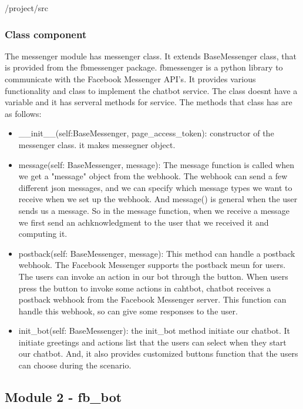 /project/src


\subsubsection {Class component}

The messenger module has messenger class. It extends BaseMessenger class, that is provided from the fbmessenger package. fbmessenger is a python library to communicate with the Facebook Messenger API's. It provides various functionality and class to implement the chatbot service. The class doesnt have a variable and it has serveral methods for service. The methods that class has are as follows:

\begin{itemize}
\item \_\_init\_\_(self:BaseMessenger, page\_access\_token): constructor of the messenger class. it makes messegner object.
\item message(self: BaseMessenger, message): The message function is called when we get a "message" object from the webhook. The webhook can send a few different json messages, and we can specify which message types we want to receive when we set up the webhook. And message() is general when the user sends us a message. So in the message function, when we receive a message we first send an achknowledgment to the user that we received it and computing it. 
\item postback(self: BaseMessenger, message): This method can handle a postback webhook. The Facebook Messenger supports the postback meun for users. The users can invoke an action in our bot through the button. When users press the button to invoke some actions in cahtbot, chatbot receives a postback webhook from the Facebook Messenger server. This function can handle this webhook, so can give some responses to the user.
\item init\_bot(self: BaseMessenger): the init\_bot method initiate our chatbot. It initiate greetings and actions list that the users can select when they start our chatbot. And, it also provides customized buttons function that the users can choose during the scenario. 
\end{itemize} 

\FloatBarrier

\subsection{Module 2 - fb\_bot}


